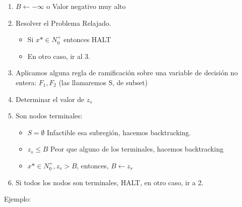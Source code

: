 \documentclass[12pt, twoside, openright]{report} %
\begin{document}
    \begin{enumerate}

    \item
      $B ← -\infty$ o Valor negativo muy alto
    \item
      Resolver el Problema Relajado.

      \begin{itemize}
    	\vspace{-0.5cm}

      \item
        Si \(x* \in N^+_0\) entonces HALT
      \item
        En otro caso, ir al 3.
      \end{itemize}
    \item
      Aplicamos alguna regla de ramificación sobre una variable de
      decisión no entera: \(F_1, F_2\) (las llamaremos S, de subset)
    \item
      Determinar el valor de \(z_s\)
    \item
      Son nodos terminales:
	  \vspace{-0.5cm}

      \begin{itemize}
    
      \item
        \(S= \emptyset\) Infactible esa subregión, hacemos backtracking.
      \item
        \(z_s \leq B\) Peor que alguno de los terminales, hacemos
        backtracking
      \item
        \(x* \in N^+_0 , z_s > B\), entonces, \(B←z_s\)
      \end{itemize}
    \item
      Si todos los nodos son terminales, HALT, en otro caso, ir a 2.
    \end{enumerate}

	Ejemplo:
\end{document}
